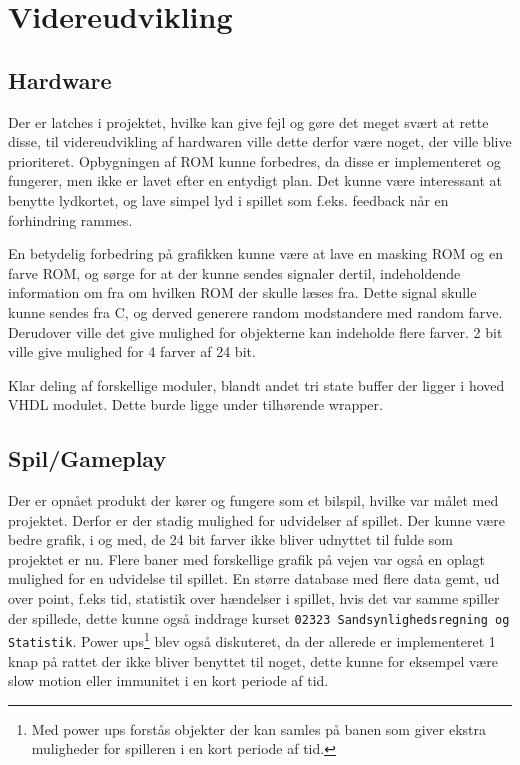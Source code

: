 \section{Videreudvikling}
\subsection{Hardware}
Der er latches i projektet, hvilke kan give fejl og gøre det meget svært at rette disse, til videreudvikling af hardwaren ville dette derfor være noget, der ville blive prioriteret. Opbygningen af ROM kunne forbedres, da disse er implementeret og fungerer, men ikke er lavet efter en entydigt plan. Det kunne være interessant at benytte lydkortet, og lave simpel lyd i spillet som f.eks. feedback når en forhindring rammes.

En betydelig forbedring på grafikken kunne være at lave en masking ROM og en farve ROM, og sørge for at der kunne sendes signaler dertil, indeholdende information om fra om hvilken ROM der skulle læses fra. Dette signal skulle kunne sendes fra C, og derved generere random modstandere med random farve. Derudover ville det give mulighed for objekterne kan indeholde flere farver. 2 bit ville give mulighed for 4 farver af 24 bit.

Klar deling af forskellige moduler, blandt andet tri state buffer der ligger i hoved VHDL modulet. Dette burde ligge under tilhørende wrapper.

\subsection{Spil/Gameplay}
Der er opnået produkt der kører og fungere som et bilspil, hvilke var målet med projektet. Derfor er der stadig mulighed for udvidelser af spillet.
Der kunne være bedre grafik, i og med, de 24 bit farver ikke bliver udnyttet til fulde som projektet er nu.
Flere baner med forskellige grafik på vejen var også en oplagt mulighed for en udvidelse til spillet.
En større database med flere data gemt, ud over point, f.eks tid, statistik over hændelser i spillet, hvis det var samme spiller der spillede, dette kunne også inddrage kurset \texttt{02323 Sandsynlighedsregning og Statistik}.
Power ups\footnote{Med power ups forstås objekter der kan samles på banen som giver ekstra muligheder for spilleren i en kort periode af tid.} blev også diskuteret, da der allerede er implementeret 1 knap på rattet der ikke bliver benyttet til noget, dette kunne for eksempel være slow motion eller immunitet i en kort periode af tid.

